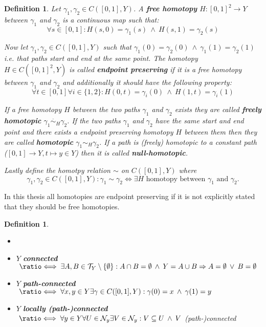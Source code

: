 \documentclass[a4paper, 11pt, twoside]{article}
\newcommand{\T}[0]{\mathcal{T}}
\newcommand{\NB}[0]{\mathcal{N}}
\newcommand*{\longeq}{\ratio\Longleftrightarrow}
\theoremstyle{break}
\theoremstyle{break}
\newtheorem{defin}[thm]{Definition}
\begin{document}
\begin{defin}
  Let $\gamma_1, \gamma_2 \in C([0, 1], Y)$. A \textbf{free homotopy} $H: [0,1]^2 \to Y$ between $\gamma_1$ and $\gamma_2$ is a continuous map such that:
  \begin{equation*}
    \forall s \in [0,1]: H(s, 0) = \gamma_1(s) \: \land \: H(s, 1) = \gamma_2(s)
  \end{equation*}

  Now let $\gamma_1, \gamma_2 \in C([0, 1], Y)$ such that $\gamma_1(0) = \gamma_2(0) \: \land \: \gamma_1(1) = \gamma_2(1)$ i.e. that paths start and end at the same point.
  The homotopy $H \in C([0,1]^2, Y)$ is called \textbf{endpoint preserving} if it is a free homotopy between $\gamma_1$ and $\gamma_2$ and additionally it should have the following property: 
  \begin{equation*}
    \forall t\in[0,1]\forall i\in \{1,2\}: H(0, t) = \gamma_i(0) \: \land \: H(1, t) = \gamma_i(1)
  \end{equation*}

  If a free homotopy $H$ between the two paths $\gamma_1$ and $\gamma_2$ exists they are called \textbf{freely homotopic} $\gamma_1 \overset{\cdot}{\sim}_H \gamma_2$.
  If the two paths $\gamma_1$ and $\gamma_2$ have the same start and end point and there exists a endpoint preserving homotopy $H$ between them then they are called 
  \textbf{homotopic} $\gamma_1 \sim_H \gamma_2$. If a path is (freely) homotopic to a constant path ($[0,1] \to Y, t \mapsto y \in Y$) then it is called \textbf{null-homotopic}.

  Lastly define the homotpy relation $\sim$ on $C([0,1], Y)$ where 
  \begin{equation*}
    \gamma_1, \gamma_2 \in C([0,1], Y): \gamma_1 \sim \gamma_2 \iff \exists H \text{ homotopy between } \gamma_1 \text{ and } \gamma_2.
  \end{equation*}
\end{defin}

In this thesis all homotopies are endpoint preserving if it is not explicitly stated that they should be free homotopies.

\begin{defin} \label{def:connectedness}
  \begin{itemize}
    \item[] %
    \item $Y$ \textbf{connected} $\;\longeq\; \exists A,B \in \T_Y\setminus \{\emptyset\}: A \cap B = \emptyset \: \land \: Y = A \cup B \Rightarrow A = \emptyset \: \lor \: B = \emptyset$
    \item $Y$ \textbf{path-connected} $\;\longeq\; \forall x,y \in Y \exists\gamma \in C([0,1], Y): \gamma(0) = x \: \land \: \gamma(1) = y$
    \item $Y$ \textbf{locally (path-)connected} $\;\longeq\; \forall y \in Y\forall U \in \NB_y\exists V\in \NB_y: V \subseteq U \: \land \: V$ (path-)connected
  \end{itemize}
\end{defin}
\end{document}
